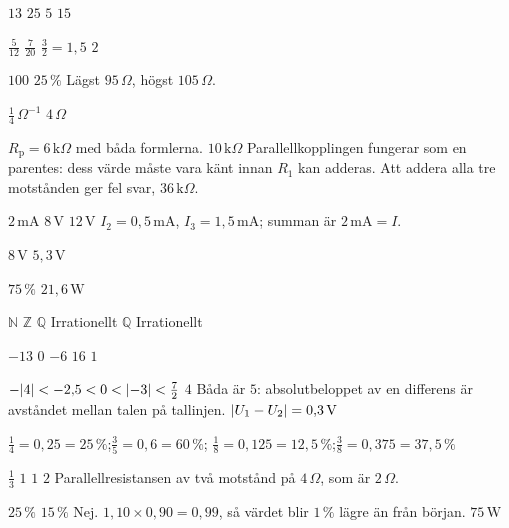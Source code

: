 
\begin{facit}

  $13$  $25$  $5$  $15$

  $\frac{5}{12}$  $\frac{7}{20}$  $\frac{3}{2} = 1{,}5$  $2$

  $100$  $25\,\%$  Lägst $95\,\Omega$, högst $105\,\Omega$.

  $\frac{1}{4}\,\Omega^{-1}$  $4\,\Omega$

  $R_{\text{p}} = 6\,\text{k}\Omega$ med båda formlerna.
 $10\,\text{k}\Omega$
 Parallellkopplingen fungerar som en parentes: dess värde måste vara känt innan $R_1$ kan
adderas. Att addera alla tre motstånden ger fel svar, $36\,\text{k}\Omega$.

  $2\,\text{mA}$  $8\,\text{V}$  $12\,\text{V}$
 $I_2 = 0{,}5\,\text{mA}$, $I_3 = 1{,}5\,\text{mA}$; summan är $2\,\text{mA} = I$.

  $8\,\text{V}$  $5{,}3\,\text{V}$

  $75\,\%$  $21{,}6\,\text{W}$

  $\mathbb{N}$  $\mathbb{Z}$  $\mathbb{Q}$  Irrationellt
 $\mathbb{Q}$  Irrationellt

  $-13$  $0$  $-6$  $16$  $1$

  $-\lvert4\rvert < -2{,}5 < 0 < \lvert-3\rvert < \frac{7}{2}$  $4$
 Båda är $5$: absolutbeloppet av en differens är avståndet mellan talen på tallinjen.
 $\lvert U_1 - U_2\rvert = 0{,}3\,\text{V}$

 $\frac{1}{4} = 0{,}25 = 25\,\%$;\enspace $\frac{3}{5} = 0{,}6 = 60\,\%$;\enspace
$\frac{1}{8} = 0{,}125 = 12{,}5\,\%$;\enspace $\frac{3}{8} = 0{,}375 = 37{,}5\,\%$

  $\frac{1}{3}$  $1$  $1$  $2$
 Parallellresistansen av två motstånd på $4\,\Omega$, som är $2\,\Omega$.

  $25\,\%$  $15\,\%$
 Nej. $1{,}10 \times 0{,}90 = 0{,}99$, så värdet blir $1\,\%$ lägre än från början.
 $75\,\text{W}$


\end{facit}

